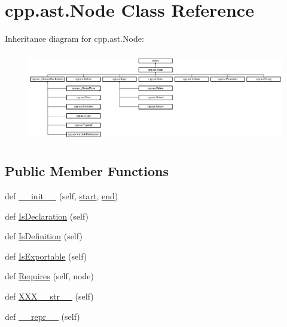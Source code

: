 \hypertarget{classcpp_1_1ast_1_1_node}{}\section{cpp.\+ast.\+Node Class Reference}
\label{classcpp_1_1ast_1_1_node}
Inheritance diagram for cpp.\+ast.\+Node\+:\begin{figure}[H]
\begin{center}
\leavevmode
\includegraphics[height=3.956044cm]{d6/d9c/classcpp_1_1ast_1_1_node}
\end{center}
\end{figure}
\subsection*{Public Member Functions}
\begin{DoxyCompactItemize}
\item 
def \mbox{\hyperlink{classcpp_1_1ast_1_1_node_a2cbd6969346645259afc3be51faae904}{\+\_\+\+\_\+init\+\_\+\+\_\+}} (self, \mbox{\hyperlink{classcpp_1_1ast_1_1_node_a7b2aa97e6a049bb1a93aea48c48f1f44}{start}}, \mbox{\hyperlink{classcpp_1_1ast_1_1_node_a3c5e5246ccf619df28eca02e29d69647}{end}})
\item 
def \mbox{\hyperlink{classcpp_1_1ast_1_1_node_ab3eca703a79fb65bc25dfbcb7547c79e}{Is\+Declaration}} (self)
\item 
def \mbox{\hyperlink{classcpp_1_1ast_1_1_node_a684ee9a357168e7e07a24fc6812f66e6}{Is\+Definition}} (self)
\item 
def \mbox{\hyperlink{classcpp_1_1ast_1_1_node_a313273874ccf578485006d4000128234}{Is\+Exportable}} (self)
\item 
def \mbox{\hyperlink{classcpp_1_1ast_1_1_node_a31ae211f954a8c578ef16226df5ac8c8}{Requires}} (self, node)
\item 
def \mbox{\hyperlink{classcpp_1_1ast_1_1_node_ab5dfeabcbcd7c1f5feb8522edffb8b4a}{X\+X\+X\+\_\+\+\_\+str\+\_\+\+\_\+}} (self)
\item 
def \mbox{\hyperlink{classcpp_1_1ast_1_1_node_ab89915656a60c7b7c752e5baa607c532}{\+\_\+\+\_\+repr\+\_\+\+\_\+}} (self)
\end{DoxyCompactItemize}
